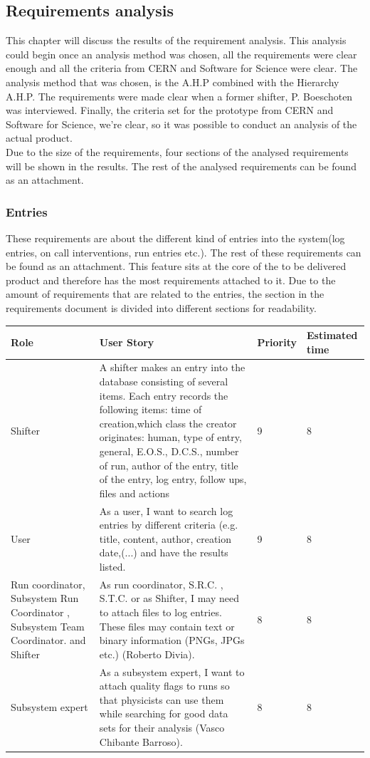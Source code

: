 \documentclass[paper=a4, fontsize=11pt,twoside]{scrartcl}	%
\begin{document}
\subsection{Requirements analysis}
This chapter will discuss the results of the requirement analysis. This analysis could begin once an analysis method was chosen, all the requirements were clear enough and all the criteria from CERN and Software for Science were clear. The analysis method that was chosen, is the A.H.P combined with the Hierarchy A.H.P. The requirements were made clear when a former shifter, P. Boeschoten was interviewed. Finally, the criteria set for the prototype from CERN and Software for Science, we're clear, so it was possible to conduct an analysis of the actual product. \\
Due to the size of the requirements, four sections of the analysed requirements will be shown in the results. The rest of the analysed requirements can be found as an attachment.\\

\subsubsection{Entries}
These requirements are about the different kind of entries into the system(log entries, on call interventions, run entries etc.). The rest of these requirements can be found as an attachment. This feature sits at the core of the to be delivered product and therefore has the most requirements attached to it. Due to the amount of requirements that are related to the entries, the section in the requirements document is divided into different sections for readability.

\begin{longtable}{ | p{3cm} | p{8cm} | p{1.5cm} | l |}
\hline
Role & User Story & Priority & Estimated time \\ \hline
Shifter &  A shifter makes an entry into the database consisting of several items. Each entry records the following items: time of creation,which class the creator originates: human, type of entry, general, E.O.S., D.C.S., number of run, author of the entry, title of the entry, log entry, follow ups, files and actions & 9 & 8 \\ \hline
User & As a user, I want to search log entries by different criteria (e.g. title, content, author, creation date,(...) and have the results listed. & 9 & 8 \\ \hline
Run coordinator, Subsystem Run Coordinator , Subsystem Team Coordinator. and Shifter& As run coordinator, S.R.C. , S.T.C. or as Shifter, I may need to attach files to log entries. These files may contain text or binary information (PNGs, JPGs etc.) (Roberto Divia). & 8 & 8 \\ \hline
Subsystem expert & As a subsystem expert, I want to attach quality flags to runs so that
physicists can use them while searching for good data sets for their analysis (Vasco Chibante Barroso). & 8 & 8 \\ \hline
\end{longtable}
\end{document}
